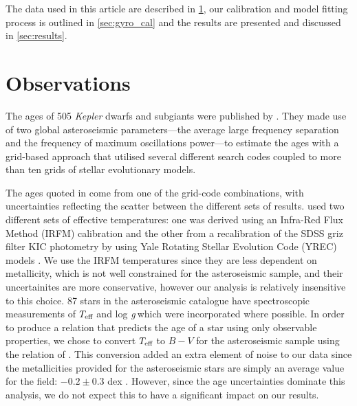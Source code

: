 \documentclass[11pt,preprint]{aastex}
\newcommand{\logg}{log \emph{g}}
\newcommand{\teff}{$T_{\rm{eff}}$}
\begin{document}
The data used in this article are described in \textsection \ref{sec:data},
our calibration and model fitting process is outlined in \textsection
\ref{sec:gyro_cal} and the results are presented and discussed in \textsection
\ref{sec:results}.

\section{Observations}
\label{sec:data}

The ages of 505 {\it Kepler} dwarfs and subgiants were published by
\citet{Chaplin2014}.
They made use of two global asteroseismic parameters---the average large
frequency separation and the frequency of maximum oscillations power---to
estimate the ages with a grid-based approach that utilised several different
search codes coupled to more than ten grids of stellar evolutionary models.

The ages quoted in \citet{Chaplin2014} come from one of the grid-code
combinations, with uncertainties reflecting the scatter between the different
sets of results.
\citet{Chaplin2014} used two different sets of effective temperatures: one was
derived using an Infra-Red Flux Method (IRFM) calibration
\citep{Casagrande2010, SilvaAguirre2012} and the other from a recalibration of
the SDSS griz filter KIC photometry by \citet{Pinsonneault2012} using Yale
Rotating Stellar Evolution Code (YREC) models \citep{Demarque2004}.
We use the IRFM temperatures since they are less dependent on metallicity,
which is not well constrained for the asteroseismic sample, and their
uncertainites are more conservative, however our analysis is relatively
insensitive to this choice.
87 stars in the asteroseismic catalogue have spectroscopic measurements of
\teff$~$and \logg$~$which were incorporated where possible.
In order to produce a relation that predicts the age of a star using only
observable properties, we chose to convert \teff$~$to $B-V$ for the
asteroseismic sample using the relation of \citet{Sekiguchi2000}.
This conversion added an extra element of noise to our data since the
metallicities provided for the asteroseismic stars are simply an average value
for the field: $-0.2\pm0.3$ dex \citep[see e.g.][]{Silva_Aguirre2011}.
However, since the age uncertainties dominate this analysis, we do not expect
this to have a significant impact on our results.
\end{document}
